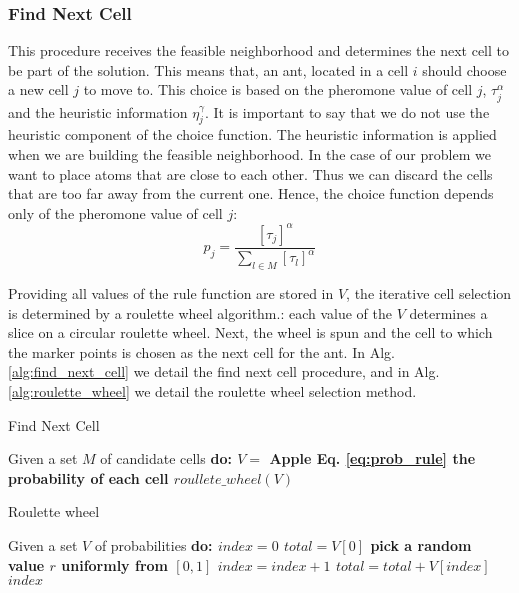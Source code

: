 		\subsubsection*{Find Next Cell}	
		This procedure receives the feasible neighborhood and determines the next cell to be part of the solution. This means that, an ant, located in a cell $i$ should choose a new cell $j$ to move to. This choice is based on the pheromone value of cell $j$, $\tau_{j}^{\alpha}$ and the heuristic information $\eta_{j}^\gamma$. It is important to say that we do not use the heuristic component of the choice function. The heuristic information is applied when we are building the feasible neighborhood. In the case of our problem we want to place atoms that are close to each other. Thus we can discard the cells that are too far away from the current one. 
		Hence, the choice function depends only of the pheromone value of cell $j$:
		\begin{equation}
			\label{eq:prob_rule}
			p_j = \frac{[\tau_j]^\alpha} {\sum_{l \in M} [\tau_l]^\alpha}
		\end{equation}
		
		Providing all values of the rule function are stored in $V$, the iterative cell selection is determined by a roulette wheel algorithm.: each value of the $V$ determines a slice on a circular roulette wheel. Next, the wheel is spun and the cell to which the marker points is chosen as the next cell for the ant. 
		In Alg. \ref{alg:find_next_cell} we detail the find next cell procedure, and in Alg. \ref{alg:roulette_wheel} we detail the roulette wheel selection method. 
		
			\begin{algorithm}
				\caption{Find Next Cell}
				\label{alg:find_next_cell}
				\begin{algorithmic}
				\STATE Given a set $M$ of candidate cells \bf{do}:
						\STATE $V =$ Apple Eq. \ref{eq:prob_rule} the probability of each cell
				\ENDFOR
				\RETURN $roullete\_wheel(V)$
				\end{algorithmic}
			\end{algorithm}
			
			\begin{algorithm}
				\caption{Roulette wheel}
				\label{alg:roulette_wheel}
				\begin{algorithmic}
				\STATE Given a set $V$ of probabilities \bf{do}:
				\STATE $index = 0$
				\STATE $total = V[0]$
				\STATE pick a random value $r$ uniformly from $[0,1]$
				\WHILE{$total < r$}
					\STATE $index = index + 1$
					\STATE $total = total + V[index]$		
				\ENDWHILE
				\RETURN $index$
				\end{algorithmic}
			\end{algorithm}
			
